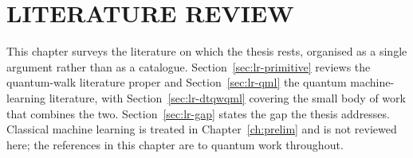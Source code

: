 \chapter{LITERATURE REVIEW}
\label{ch:litreview}

This chapter surveys the literature on which the thesis rests, organised as a
single argument rather than as a catalogue.
Section~\ref{sec:lr-primitive} reviews the quantum-walk literature proper and
Section~\ref{sec:lr-qml} the quantum machine-learning literature, with
Section~\ref{sec:lr-dtqwqml} covering the small body of work that combines the
two. Section~\ref{sec:lr-gap} states the gap the thesis addresses. Classical
machine learning is treated in Chapter~\ref{ch:prelim} and is not reviewed
here; the references in this chapter are to quantum work throughout.



